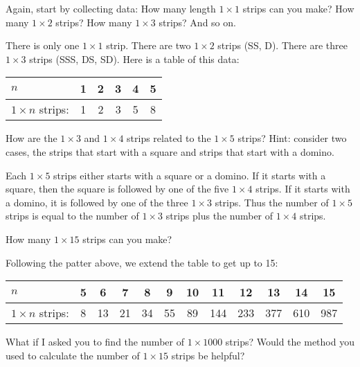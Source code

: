\documentclass[11pt]{exam}
\begin{document}
\begin{questions}
  \question Again, start by collecting data: How many length $1\times 1$ strips can you make?  How many $1\times 2$ strips?  How many $1\times 3$ strips?  And so on.
  \begin{solution}
  There is only one $1\times 1$ strip.  There are two $1\times 2$ strips (SS, D).  There are three $1\times 3$ strips (SSS, DS, SD).  Here is a table of this data:

  \begin{center}
  \begin{tabular}{l|c|c|c|c|c}
  $n$ & 1 & 2 & 3 & 4 & 5 \\ \hline
  $1\times n$ strips: & 1 & 2 & 3 & 5 & 8
  \end{tabular}
  \end{center}
  \end{solution}
  \vfill
  \question How are the $1\times 3$ and $1 \times 4$ strips related to the $1\times 5$ strips?  Hint: consider two cases, the strips that start with a square and strips that start with a domino.
  \begin{solution}
  Each $1\times 5$ strips either starts with a square or a domino.  If it starts with a square, then the square is followed by one of the five $1 \times 4$ strips.  If it starts with a domino, it is followed by one of the three $1 \times 3$ strips.  Thus the number of $1\times 5$ strips is equal to the number of $1\times 3$ strips plus the number of $1 \times 4$ strips.
  \end{solution}

  \vfill
  \question How many $1\times 15$ strips can you make?
  \begin{solution}
	  Following the patter above, we extend the table to get up to 15:
	    \begin{center}
	    \begin{tabular}{l|c|c|c|c|c|c|c|c|c|c|c}
	    $n$ & 5 & 6 & 7 & 8 & 9 & 10 & 11 & 12 & 13 & 14 & 15 \\ \hline
	    $1\times n$ strips: & 8 & 13 & 21 & 34 & 55 & 89 & 144 & 233 & 377 & 610 & 987
	    \end{tabular}
	    \end{center}
  \end{solution}
  \vfill
  \vfill
  \question What if I asked you to find the number of $1\times 1000$ strips?  Would the method you used to calculate the number of  $1 \times 15$ strips be helpful?


\end{questions}
\end{document}
